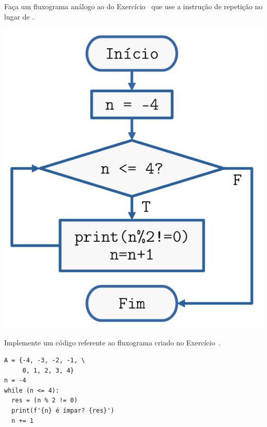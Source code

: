\begin{exer}\label{cap_progest_sec_est:exer:while}
  Faça um fluxograma análogo ao do Exercício~ que use a instrução de repetição {\PYTHONwhile} no lugar de {\PYTHONfor}.
\end{exer}
\begin{resp}

  \includegraphics{cap_progest/dados/fig_exer_while/fig.png}

\end{resp}

\begin{exer}
  Implemente um código referente ao fluxograma criado no Exercício~.
\end{exer}
\begin{resp}

\begin{lstlisting}
A = {-4, -3, -2, -1, \
     0, 1, 2, 3, 4}
n = -4
while (n <= 4):
  res = (n % 2 != 0)
  print(f'{n} é ímpar? {res}')
  n += 1
\end{lstlisting}

\end{resp}

